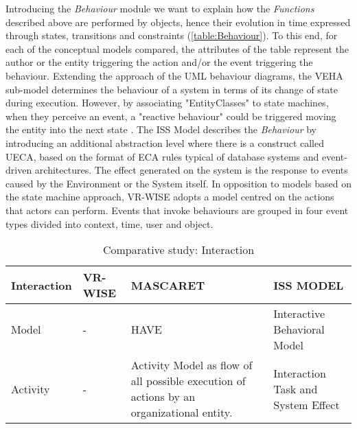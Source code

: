Introducing the \textit{Behaviour} module we want to explain how the \textit{Functions} described above are performed by objects, hence their evolution in time expressed through states, transitions and constraints (\autoref{table:Behaviour}). To this end, for each of the conceptual models compared, the attributes of the table represent the author or the entity triggering the action and/or the event triggering the behaviour. Extending the approach of the UML behaviour diagrams, the VEHA sub-model determines the behaviour of a system in terms of its change of state during execution. However, by associating "EntityClasses" to state machines, when they perceive an event, a "reactive behaviour" could be triggered moving the entity into the next state \cite{chevaillier_semantic_2012}. The ISS Model describes the \textit{Behaviour} by introducing an additional abstraction level where there is a construct called UECA, based on the format of ECA rules typical of database systems and event-driven architectures. The effect generated on the system is the response to events caused by the Environment or the System itself. In opposition to models based on the state machine approach, VR-WISE adopts a model centred on the actions that actors can perform. Events that invoke behaviours are grouped in four event types divided into context, time, user and object. 

\begin{table}
\begin{tabular}{|p{2.2cm}|p{3.1cm}|p{3.1cm}|p{3.1cm}|} 
\hline %
\textbf{Interaction} 
& \textbf{VR-WISE} 
& \textbf{MASCARET}
& \textbf{ISS MODEL} \\ 
\hline
Model
& - 
& HAVE
& Interactive Behavioral Model \\ 
\hline
Activity
& -
& Activity Model as flow of all possible execution of actions by an organizational entity.
& Interaction Task and System Effect \\ 
\hline
\end{tabular} 
\caption{Comparative study: Interaction}
\label{table:Interaction}
\end{table}


